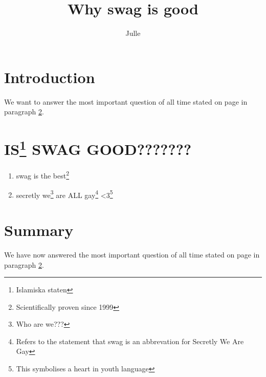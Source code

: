 \documentclass[a4paper, titlepage]{article}
\title{Why swag is good}
\author{Julle}
\begin{document}
\maketitle

\section{Introduction}
We want to answer the most important question of all time stated on page \pageref{sweg} in paragraph \ref{sweg}.

\section{IS\footnote{Islamiska staten} SWAG GOOD???????}\label{sweg}

\begin{enumerate}
\item swag is the best\footnote{Scientifically proven since 1999}
\item secretly we\footnote{Who are we???} are ALL gay\footnote{Refers to the statement that swag is an abbrevation for Secretly We Are Gay} <3\footnote{This symbolises a heart in youth language}
\end{enumerate}

\section{Summary}
We have now answered the most important question of all time stated on page \pageref{sweg} in paragraph \ref{sweg}.
\end{document}
